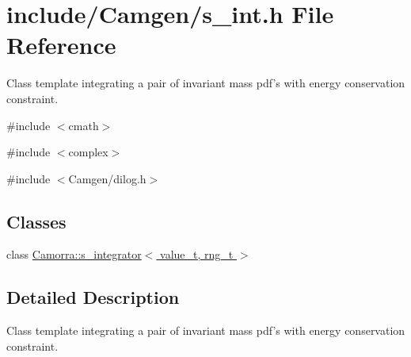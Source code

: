 \hypertarget{a00628}{
\section{include/Camgen/s\_\-int.h File Reference}
\label{a00628}
}


Class template integrating a pair of invariant mass pdf's with energy conservation constraint.  


{\ttfamily \#include $<$cmath$>$}\par
{\ttfamily \#include $<$complex$>$}\par
{\ttfamily \#include $<$Camgen/dilog.h$>$}\par
\subsection*{Classes}
\begin{DoxyCompactItemize}
\item 
class \hyperlink{a00478}{Camorra::s\_\-integrator$<$ value\_\-t, rng\_\-t $>$}
\end{DoxyCompactItemize}


\subsection{Detailed Description}
Class template integrating a pair of invariant mass pdf's with energy conservation constraint. 